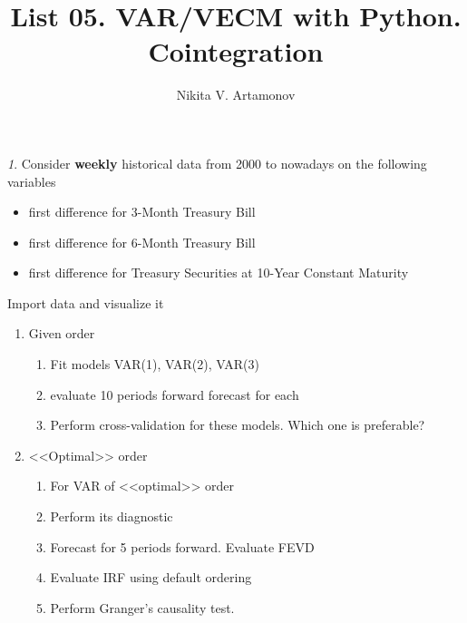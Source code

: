 \documentclass[12pt]{article}
\title{List 05. VAR/VECM with Python. Cointegration}
\author{Nikita V. Artamonov}
\theoremstyle{remark}
\newtheorem{exercise}{}[section]
\begin{document}
\maketitle



\begin{exercise}
Consider \textbf{weekly} historical data from 2000 to nowadays on the following variables
\begin{itemize}
	\item first difference for 3-Month Treasury Bill
	\item first difference for 6-Month Treasury Bill
	\item first difference for Treasury Securities at 10-Year Constant Maturity
\end{itemize}
Import data and visualize it
\begin{enumerate}
	\item Given order
	\begin{enumerate}
		\item Fit models VAR(1), VAR(2), VAR(3)
		\item evaluate 10 periods forward forecast for each 
		\item Perform cross-validation for these models. Which one is preferable?
	\end{enumerate}
	\item <<Optimal>> order
	\begin{enumerate}
		\item For VAR of <<optimal>> order
		\item Perform its diagnostic
		\item Forecast for 5 periods forward. Evaluate FEVD
		\item Evaluate IRF using default ordering
		\item Perform Granger's causality test.
	\end{enumerate}
\end{enumerate}
\end{exercise}
\end{document}
